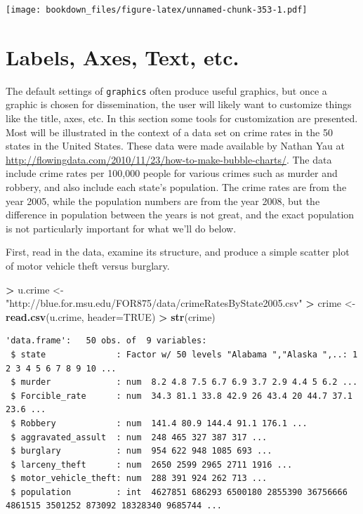 \documentclass[]{krantz}
\makeatletter
\newenvironment{Shaded}{\begin{snugshade}}{\end{snugshade}}
\newcommand{\KeywordTok}[1]{\textcolor[rgb]{0.27,0.27,0.27}{\textbf{#1}}}
\newcommand{\DataTypeTok}[1]{\textcolor[rgb]{0.27,0.27,0.27}{#1}}
\newcommand{\StringTok}[1]{\textcolor[rgb]{0.5,0.5,0.5}{#1}}
\newcommand{\OtherTok}[1]{\textcolor[rgb]{0.37,0.37,0.37}{#1}}
\newcommand{\OperatorTok}[1]{\textcolor[rgb]{0.43,0.43,0.43}{\textbf{#1}}}
\newcommand{\NormalTok}[1]{#1}
\newenvironment{kframe}{%
\medskip{}
\setlength{\fboxsep}{.8em}
 \def\at@end@of@kframe{}%
 \ifinner\ifhmode%
  \def\at@end@of@kframe{\end{minipage}}%
  \begin{minipage}{\columnwidth}%
 \fi\fi%
 \def\FrameCommand##1{\hskip\@totalleftmargin \hskip-\fboxsep
 \colorbox{shadecolor}{##1}\hskip-\fboxsep
     \hskip-\linewidth \hskip-\@totalleftmargin \hskip\columnwidth}%
 \MakeFramed {\advance\hsize-\width
   \@totalleftmargin\z@ \linewidth\hsize
   \@setminipage}}%
 {\par\unskip\endMakeFramed%
 \at@end@of@kframe}
\renewenvironment{Shaded}{\begin{kframe}}{\end{kframe}}
\makeatother
\begin{document}
\texttt{[image: bookdown\_files/figure-latex/unnamed-chunk-353-1.pdf]}

\section{Labels, Axes, Text, etc.}\label{labels-axes-text-etc.-1}

The default settings of \texttt{graphics} often produce useful graphics,
but once a graphic is chosen for dissemination, the user will likely
want to customize things like the title, axes, etc. In this section some
tools for customization are presented. Most will be illustrated in the
context of a data set on crime rates in the 50 states in the United
States. These data were made available by Nathan Yau at
\url{http://flowingdata.com/2010/11/23/how-to-make-bubble-charts/}. The
data include crime rates per 100,000 people for various crimes such as
murder and robbery, and also include each state's population. The crime
rates are from the year 2005, while the population numbers are from the
year 2008, but the difference in population between the years is not
great, and the exact population is not particularly important for what
we'll do below.

First, read in the data, examine its structure, and produce a simple
scatter plot of motor vehicle theft versus burglary.

\begin{Shaded}
\begin{Highlighting}[]
\OperatorTok{>}\StringTok{ }\NormalTok{u.crime <-}\StringTok{ "http://blue.for.msu.edu/FOR875/data/crimeRatesByState2005.csv"}
\OperatorTok{>}\StringTok{ }\NormalTok{crime <-}\StringTok{ }\KeywordTok{read.csv}\NormalTok{(u.crime, }\DataTypeTok{header=}\OtherTok{TRUE}\NormalTok{)}
\OperatorTok{>}\StringTok{ }\KeywordTok{str}\NormalTok{(crime)}
\end{Highlighting}
\end{Shaded}

\begin{verbatim}
'data.frame':   50 obs. of  9 variables:
 $ state              : Factor w/ 50 levels "Alabama ","Alaska ",..: 1 2 3 4 5 6 7 8 9 10 ...
 $ murder             : num  8.2 4.8 7.5 6.7 6.9 3.7 2.9 4.4 5 6.2 ...
 $ Forcible_rate      : num  34.3 81.1 33.8 42.9 26 43.4 20 44.7 37.1 23.6 ...
 $ Robbery            : num  141.4 80.9 144.4 91.1 176.1 ...
 $ aggravated_assult  : num  248 465 327 387 317 ...
 $ burglary           : num  954 622 948 1085 693 ...
 $ larceny_theft      : num  2650 2599 2965 2711 1916 ...
 $ motor_vehicle_theft: num  288 391 924 262 713 ...
 $ population         : int  4627851 686293 6500180 2855390 36756666 4861515 3501252 873092 18328340 9685744 ...
\end{verbatim}
\end{document}
